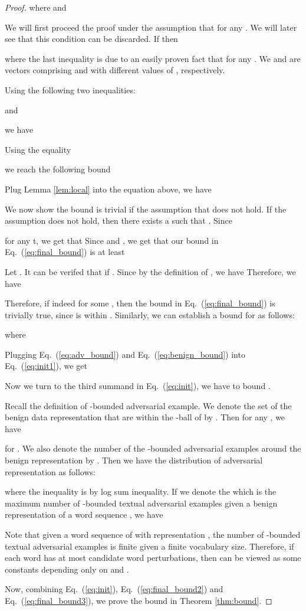 \documentclass{article} \usepackage{iclr2021_conference,times}
\theoremstyle{definition}
\theoremstyle{remark}
\begin{document}
\begin{proof}
where  and 

We will first proceed the proof under the assumption that  for any . We will later see that this condition can be discarded. If  then

where the last inequality is due to an easily proven fact that for any . We  and  are vectors comprising  and  with different values of , respectively.

Using the following two inequalities:

and

we have 


Using the equality

we reach the following bound


Plug Lemma \ref{lem:local} into the equation above, we have


We now show the bound is trivial if the assumption that  does not hold. If the assumption does not hold, then there exists a  such that . Since

for any t, we get that  Since  and , we get that our bound in Eq.~(\ref{eq:final_bound}) is at least 


Let . It can be verifed that  if . Since  by the definition of , we have  Therefore, we have 


Therefore, if indeed  for some , then the bound in Eq.~(\ref{eq:final_bound}) is trivially true, since  is within .
Similarly, we can establish a bound for  as follows:

where 

Plugging Eq.~(\ref{eq:adv_bound}) and Eq.~(\ref{eq:benign_bound}) into Eq.~(\ref{eq:init1}), we get 


Now we turn to the third summand in Eq.~(\ref{eq:init}), we have to bound .  


Recall the definition of -bounded adversarial example. We denote the set of the benign data representation  that are within the -ball of  by . Then for any , we have 

for . We also denote the number of the -bounded adversarial examples around the benign representation  by . Then we have the distribution of adversarial representation  as follows:




where the inequality is by log sum inequality. If we denote the  which is the maximum number of -bounded textual adversarial examples given a benign representation  of a word sequence , we have 

Note that given a word sequence  of  with representation , the number of -bounded textual adversarial examples  is finite given a finite vocabulary size. Therefore, if each word has at most  candidate word perturbations, then  can be viewed as some constants depending only on  and .

Now, combining Eq.~(\ref{eq:init}), Eq.~(\ref{eq:final_bound2}) and Eq.~(\ref{eq:final_bound3}), we prove the bound in Theorem \ref{thm:bound}.
\end{proof}




 
\end{document}

